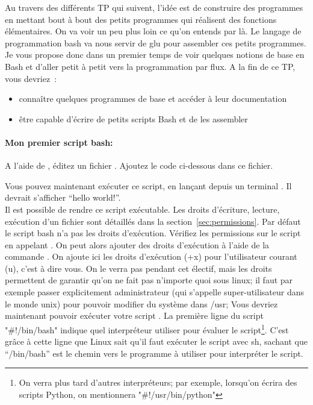 Au travers des différents TP qui suivent, l'idée est de construire des programmes en mettant bout à bout des petits programmes qui réalisent des fonctions élémentaires. On va voir un peu plus loin ce qu'on entends par là. Le langage de programmation bash va nous servir de glu pour assembler ces petits programmes. Je vous propose donc dans un premier temps de voir quelques notions de base en Bash et d'aller petit à petit vers la programmation par flux. A la fin de ce TP, vous devriez~:
\begin{itemize}
\item connaître quelques programmes de base et accéder à leur documentation
\item être capable d'écrire de petits scripts Bash et de les assembler
\end{itemize}


\paragraph{Mon premier script bash:}

A l'aide de \emacs, éditez un fichier . Ajoutez le code ci-dessous dans ce fichier.

\cprotect{}
Vous pouvez maintenant exécuter ce script, en lançant depuis un terminal . Il devrait s'afficher ``hello world!''.\\

Il est possible de rendre ce script exécutable. Les droits d'écriture, lecture, exécution d'un fichier sont détaillés dans la section~\ref{sec:permissions}. Par défaut le script bash n'a pas les droits d'exécution. Vérifiez les permissions sur le script en appelant . On peut alors ajouter des droits d'exécution à l'aide de la commande . On ajoute ici les droits d'exécution (+x) pour l'utilisateur courant (u), c'est à dire vous. On le verra pas pendant cet électif, mais les droits permettent de garantir qu'on ne fait pas n'importe quoi sous linux; il faut par exemple passer explicitement administrateur (qui s'appelle super-utilisateur dans le monde unix) pour pouvoir modifier du système dans /usr; Vous devriez maintenant pouvoir exécuter votre script . La première ligne du script "\#!/bin/bash" indique quel interpréteur utiliser pour évaluer le script\footnote{On verra plus tard d'autres interpréteurs; par exemple, lorsqu'on écrira des scripts Python, on mentionnera "\#!/usr/bin/python"}. C'est grâce à cette ligne que Linux sait qu'il faut exécuter le script avec sh, sachant que ``/bin/bash'' est le chemin vers le programme à utiliser pour interpréter le script.


